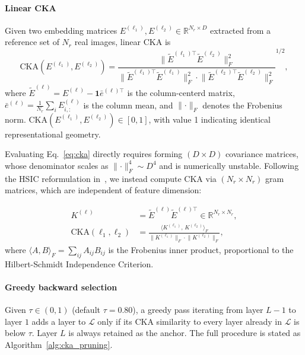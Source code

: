 \documentclass[lettersize,journal]{IEEEtran}
\begin{document}
\paragraph{Linear CKA}
Given two embedding matrices $E^{(\ell_1)}, E^{(\ell_2)} \in \mathbb{R}^{N_r \times D}$ extracted from a reference set of $N_r$ real images, linear CKA is
\begin{equation}
  \label{eq:cka}
  \mathrm{CKA}(E^{(\ell_1)}, E^{(\ell_2)})
  = \frac{\lVert \tilde{E}^{(\ell_1)\top}
                 \tilde{E}^{(\ell_2)} \rVert_F^2}
         {\lVert \tilde{E}^{(\ell_1)\top}
                 \tilde{E}^{(\ell_1)} \rVert_F^2
          \cdot
          \lVert \tilde{E}^{(\ell_2)\top}
                 \tilde{E}^{(\ell_2)} \rVert_F^2}^{1/2},
\end{equation}
where $\tilde{E}^{(\ell)} = E^{(\ell)} - \mathbf{1}\bar{e}^{(\ell)\top}$ is the column-centerd matrix, $\bar{e}^{(\ell)} = \frac{1}{N_r}\sum_i E^{(\ell)}_{i,:}$ is the column mean, and $\lVert \cdot \rVert_F$ denotes the Frobenius norm. $\mathrm{CKA}(E^{(\ell_1)}, E^{(\ell_2)}) \in [0, 1]$, with value 1 indicating identical representational geometry.

Evaluating Eq.~\eqref{eq:cka} directly requires forming
$(D \times D)$ covariance matrices, whose denominator scales as
$\lVert \cdot \rVert_F^4 \sim D^4$ and is numerically unstable. Following
the HSIC reformulation in~\cite{kornblith2019cka}, we instead compute CKA
via $(N_r \times N_r)$ gram matrices, which are independent of feature
dimension:

\begin{align}
  K^{(\ell)} &= \tilde{E}^{(\ell)} \tilde{E}^{(\ell)\top}
               \in \mathbb{R}^{N_r \times N_r},
  \label{eq:gram} \\
  \mathrm{CKA}(\ell_1, \ell_2)
  &= \frac{\langle K^{(\ell_1)},\, K^{(\ell_2)} \rangle_F}
          {\lVert K^{(\ell_1)} \rVert_F \cdot
           \lVert K^{(\ell_2)} \rVert_F},
  \label{eq:cka_gram}
\end{align}
where $\langle A, B \rangle_F = \sum_{ij} A_{ij} B_{ij}$ is the
Frobenius inner product, proportional to the Hilbert-Schmidt
Independence Criterion.

\paragraph{Greedy backward selection}
Given $\tau \in (0, 1)$ (default $\tau = 0.80$), a greedy pass
iterating from layer $L-1$ to layer $1$ adds a layer to $\mathcal{L}$ only if its CKA similarity to every layer already in $\mathcal{L}$ is below $\tau$. Layer $L$ is always retained as the anchor. The full procedure is stated as Algorithm~\ref{alg:cka_pruning}.
\end{document}
